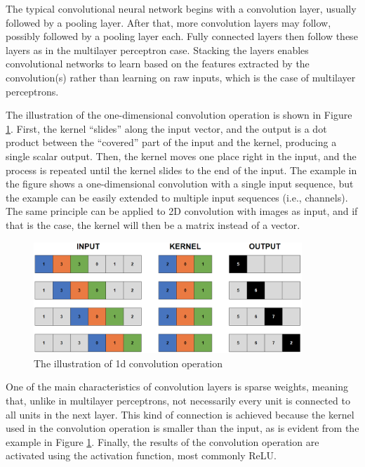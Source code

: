 The typical convolutional neural network begins with a convolution layer, usually followed by a pooling layer. After that, more convolution layers may follow, possibly followed by a pooling layer each. Fully connected layers then follow these layers as in the multilayer perceptron case. Stacking the layers enables convolutional networks to learn based on the features extracted by the convolution(s) rather than learning on raw inputs, which is the case of multilayer perceptrons.

The illustration of the one-dimensional convolution operation is shown in Figure \ref{fig:Conv1d}. First, the kernel ``slides'' along the input vector, and the output is a dot product between the ``covered'' part of the input and the kernel, producing a single scalar output. Then, the kernel moves one place right in the input, and the process is repeated until the kernel slides to the end of the input. The example in the figure shows a one-dimensional convolution with a single input sequence, but the example can be easily extended to multiple input sequences (i.e., channels). The same principle can be applied to 2D convolution with images as input, and if that is the case, the kernel will then be a matrix instead of a vector.

\begin{figure}
    \centering
    \includegraphics[width=0.9\textwidth]{slike/conv1d.png}
    \caption{The illustration of 1d convolution operation}
    \label{fig:Conv1d}
\end{figure}

One of the main characteristics of convolution layers is sparse weights, meaning that, unlike in multilayer perceptrons, not necessarily every unit is connected to all units in the next layer. This kind of connection is achieved because the kernel used in the convolution operation is smaller than the input, as is evident from the example in Figure \ref{fig:Conv1d}. Finally, the results of the convolution operation are activated using the activation function, most commonly ReLU.

